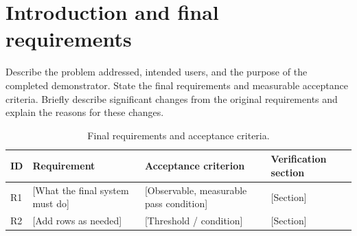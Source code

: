 \chapter{Introduction and final requirements}
\label{sec:introduction}

Describe the problem addressed, intended users, and the purpose of the
completed demonstrator. State the final requirements and measurable
acceptance criteria. Briefly describe significant changes from the original
requirements and explain the reasons for these changes.

\begin{table}[htbp]
  \centering
  \caption{Final requirements and acceptance criteria.}
  \label{tab:requirements}
  \begin{tabularx}{\linewidth}{lYYY}
    \toprule
    ID & Requirement & Acceptance criterion & Verification section \\
    \midrule
    R1 & [What the final system must do] &
    [Observable, measurable pass condition] & [Section] \\
    R2 & [Add rows as needed] &
    [Threshold / condition] & [Section] \\
    \bottomrule
  \end{tabularx}
\end{table}
